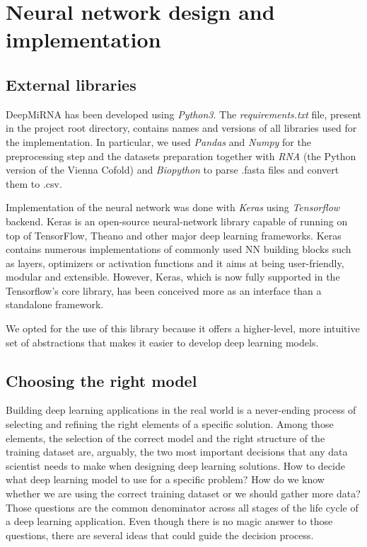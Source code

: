 
\chapter{Neural network design and implementation} %

\label{Chapter4} %

\section{External libraries}
DeepMiRNA has been developed using \emph{Python3}. The \emph{requirements.txt} file, present in the project root directory, contains names and versions of all libraries used for the implementation. In particular, we used \emph{Pandas} and \emph{Numpy} for the preprocessing step and the datasets preparation together with \emph{RNA} (the Python version of the Vienna Cofold) and \emph{Biopython} to parse .fasta files and convert them to .csv. 

Implementation of the neural network was done with \emph{Keras}\cite{keras} using \emph{Tensorflow} backend\cite{tensorflow}. Keras is an open-source neural-network library capable of running on top of TensorFlow, Theano and other major deep learning frameworks. Keras contains numerous implementations of commonly used NN building blocks such as layers, optimizers or activation functions and it aims at being user-friendly, modular and extensible. However, Keras, which is now fully supported in the Tensorflow's core library, has been conceived more as an interface than a standalone framework. 

We opted for the use of this library because it offers a higher-level, more intuitive set of abstractions that makes it easier to develop deep learning models.    

\section{Choosing the right model}
Building deep learning applications in the real world is a never-ending process of selecting and refining the right elements of a specific solution. Among those elements, the selection of the correct model and the right structure of the training dataset are, arguably, the two most important decisions that any data scientist needs to make when designing deep learning solutions. How to decide what deep learning model to use for a specific problem? How do we know whether we are using the correct training dataset or we should gather more data? Those questions are the common denominator across all stages of the life cycle of a deep learning application. Even though there is no magic answer to those questions, there are several ideas that could guide the decision process. 

